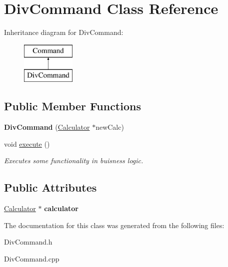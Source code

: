 \hypertarget{class_div_command}{}\section{Div\+Command Class Reference}
\label{class_div_command}
Inheritance diagram for Div\+Command\+:\begin{figure}[H]
\begin{center}
\leavevmode
\includegraphics[height=2.000000cm]{class_div_command}
\end{center}
\end{figure}
\subsection*{Public Member Functions}
\begin{DoxyCompactItemize}
\item 
\hypertarget{class_div_command_a5e28151ba2330f4d6847723d278d2dbc}{}{\bfseries Div\+Command} (\hyperlink{class_calculator}{Calculator} $\ast$new\+Calc)\label{class_div_command_a5e28151ba2330f4d6847723d278d2dbc}

\item 
\hypertarget{class_div_command_aca34d3ac23406928629550a6d1177e0a}{}void \hyperlink{class_div_command_aca34d3ac23406928629550a6d1177e0a}{execute} ()\label{class_div_command_aca34d3ac23406928629550a6d1177e0a}

\begin{DoxyCompactList}\small\item\em Executes some functionality in buisness logic. \end{DoxyCompactList}\end{DoxyCompactItemize}
\subsection*{Public Attributes}
\begin{DoxyCompactItemize}
\item 
\hypertarget{class_div_command_a8773c788944f656a12c1653792abda07}{}\hyperlink{class_calculator}{Calculator} $\ast$ {\bfseries calculator}\label{class_div_command_a8773c788944f656a12c1653792abda07}

\end{DoxyCompactItemize}


The documentation for this class was generated from the following files\+:\begin{DoxyCompactItemize}
\item 
Div\+Command.\+h\item 
Div\+Command.\+cpp\end{DoxyCompactItemize}
